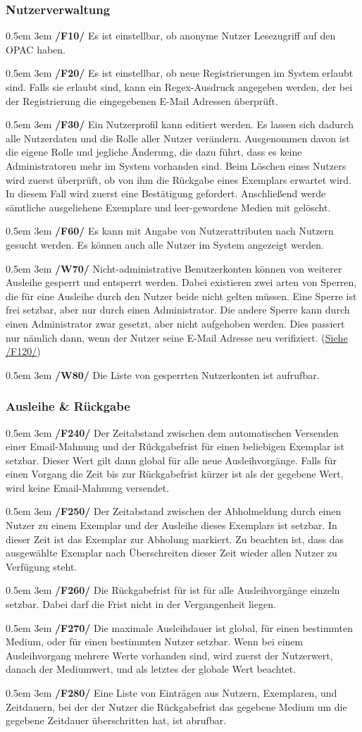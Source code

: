\documentclass{article}
\newcommand{\specification}[3]{
	{\parindent 0.5em \hangindent 3em \hypertarget{spec:#1:#2}{\textbf{/#1#2/}} #3 \par \nobreak \vspace*{0.5em}}
}
\begin{document}
	\subsubsection{Nutzerverwaltung}
		\specification{F}{10}{Es ist einstellbar, ob anonyme Nutzer Lesezugriff auf den OPAC haben. }
		\specification{F}{20}{Es ist einstellbar, ob neue Registrierungen im System erlaubt sind. Falls sie erlaubt sind, kann ein Regex-Ausdruck angegeben werden, der bei der Registrierung die eingegebenen E-Mail Adressen überprüft. }
		\specification{F}{30}{Ein Nutzerprofil kann editiert werden. Es lassen sich dadurch alle Nutzerdaten und die Rolle aller Nutzer verändern.
			Ausgenommen davon ist die eigene Rolle und jegliche Änderung, die dazu führt, dass es keine Administratoren mehr im System vorhanden sind.
			Beim Löschen eines Nutzers wird zuerst überprüft, ob von ihm die Rückgabe eines Exemplars erwartet wird.
			In diesem Fall wird zuerst eine Bestätigung gefordert. Anschließend werde sämtliche ausgeliehene Exemplare und leer-gewordene Medien mit gelöscht. }
		\specification{F}{60}{Es kann mit Angabe von Nutzerattributen nach Nutzern gesucht werden. Es können auch alle Nutzer im System angezeigt werden. }
		\specification{W}{70}{Nicht-administrative Benutzerkonten können von weiterer Ausleihe gesperrt und entsperrt werden. Dabei existieren zwei arten von Sperren, die für eine Ausleihe durch den Nutzer beide nicht gelten müssen.
			Eine Sperre ist frei setzbar, aber nur durch einen Administrator. Die andere Sperre kann durch einen Administrator zwar gesetzt, aber nicht aufgehoben werden.
			Dies passiert nur nämlich dann, wenn der Nutzer seine E-Mail Adresse neu verifiziert. (\hyperlink{spec:F:120}{Siehe /F120/}) }
		\specification{W}{80}{Die Liste von gesperrten Nutzerkonten ist aufrufbar. }
	\subsubsection{Ausleihe \& Rückgabe}
		\specification{F}{240}{Der Zeitabstand zwischen dem automatischen Versenden einer Email-Mahnung und der Rückgabefrist für einen beliebigen Exemplar ist setzbar.
			Dieser Wert gilt dann global für alle neue Ausleihvorgänge. Falls für einen Vorgang die Zeit bis zur Rückgabefrist kürzer ist als der gegebene Wert, wird keine Email-Mahnung versendet. }
		\specification{F}{250}{Der Zeitabstand zwischen der Abholmeldung durch einen Nutzer zu einem Exemplar und der Ausleihe dieses Exemplars ist setzbar.
			In dieser Zeit ist das Exemplar zur Abholung markiert. Zu beachten ist, dass das ausgewählte Exemplar nach Überschreiten dieser Zeit wieder allen Nutzer zu Verfügung steht. }
		\specification{F}{260}{Die Rückgabefrist für ist für alle Ausleihvorgänge einzeln setzbar. Dabei darf die Frist nicht in der Vergangenheit liegen. }
		\specification{F}{270}{Die maximale Ausleihdauer ist global, für einen bestimmten Medium, oder für einen bestimmten Nutzer setzbar.
			Wenn bei einem Ausleihvorgang mehrere Werte vorhanden sind, wird zuerst der Nutzerwert, danach der Mediumwert, und als letztes der globale Wert beachtet. }
		\specification{F}{280}{Eine Liste von Einträgen aus Nutzern, Exemplaren, und Zeitdauern, bei der der Nutzer die Rückgabefrist das gegebene Medium um die gegebene Zeitdauer überschritten hat, ist abrufbar. }
\end{document}
